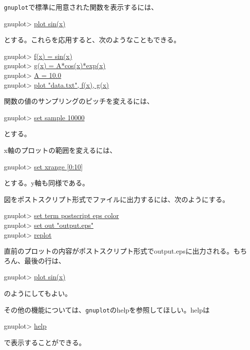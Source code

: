 {{\tt gnuplot}で標準に用意された関数を表示するには、
\begin{commandline2}
gnuplot> \underline{plot sin(x)}
\end{commandline2} \noindent
とする。これらを応用すると、次のようなこともできる。
\begin{commandline2}
gnuplot> \underline{f(x) = sin(x)} \\
gnuplot> \underline{g(x) = A*cos(x)*exp(x)} \\
gnuplot> \underline{A = 10.0} \\
gnuplot> \underline{plot "data.txt", f(x), g(x)}
\end{commandline2} \noindent
関数の値のサンプリングのピッチを変えるには、
\begin{commandline2}
gnuplot> \underline{set sample 10000}
\end{commandline2} \noindent
とする。

x軸のプロットの範囲を変えるには、
\begin{commandline2}
gnuplot> \underline{set xrange [0:10]}
\end{commandline2} \noindent
とする。y軸も同様である。

図をポストスクリプト形式でファイルに出力するには、次のようにする。
\begin{commandline2}
gnuplot> \underline{set term postscript eps color} \\
gnuplot> \underline{set out "output.eps"} \\
gnuplot> \underline{replot}
\end{commandline2} \noindent
直前のプロットの内容がポストスクリプト形式でoutput.epsに出力される。もちろん、最後の行は、
\begin{commandline2}
gnuplot> \underline{plot sin(x)}
\end{commandline2} \noindent
のようにしてもよい。

その他の機能については、{\tt gnuplot}のhelpを参照してほしい。helpは
\begin{commandline2}
gnuplot> \underline{help}
\end{commandline2} \noindent
で表示することができる。


}

